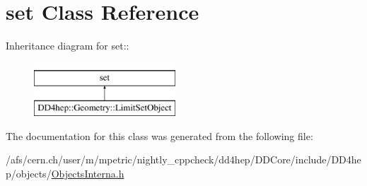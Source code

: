 \hypertarget{classstd_1_1set}{
\section{set Class Reference}
\label{classstd_1_1set}
}
Inheritance diagram for set::\begin{figure}[H]
\begin{center}
\leavevmode
\includegraphics[height=2cm]{classstd_1_1set}
\end{center}
\end{figure}


The documentation for this class was generated from the following file:\begin{DoxyCompactItemize}
\item 
/afs/cern.ch/user/m/mpetric/nightly\_\-cppcheck/dd4hep/DDCore/include/DD4hep/objects/\hyperlink{_objects_interna_8h}{ObjectsInterna.h}\end{DoxyCompactItemize}
